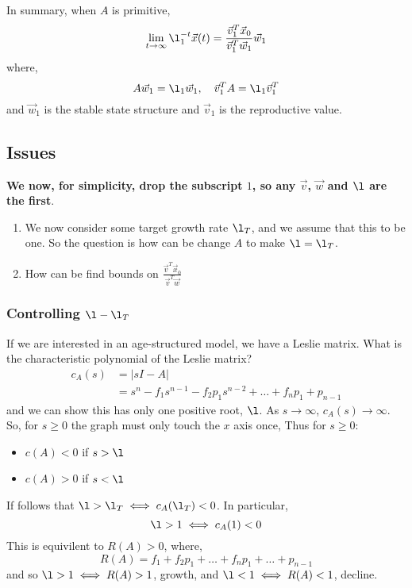 \noindent
In summary, when $A$ is primitive,
$$ \lim_{t \to \infty} \l_1^{-t}\vec x(t) = \frac{\vec v_1^T \vec x_0}{\vec v_1^T\vec w_1}\vec w_1 $$
where,
$$ A\vec w_1 = \l_1\vec w_1, \quad \vec v_1^T A = \l_1\vec v_1^T $$
and $\vec w_1$ is the stable state structure and $\vec v_1$ is the reproductive value.\\

\subsection{Issues}

\textbf{We now, for simplicity, drop the subscript $1$, so any $\vec v$, $\vec w$ and $\l$ are the first}.\\

\noindent
\begin{enumerate}
  \item We now consider some target growth rate $\l_T$, and we assume that this to be one. So the question is how can be change $A$ to make $\l = \l_T$.
  \item How can be find bounds on $\frac{\vec v^T \vec x_0}{\vec v^T\vec w}$
\end{enumerate}

\subsubsection{Controlling $\l - \l_T$}
If we are interested in an age-structured model, we have a Leslie matrix. What is the characteristic polynomial of the Leslie matrix?
\begin{align*}
  c_A(s) &= |sI - A| \\
  &= s^n - f_1s^{n-1} - f_2p_1s^{n-2} + \dots + f_np_1 + p_{n-1}
\end{align*}
and we can show this has only one positive root, $\l$. As $s \to \infty$, $c_A(s) \to \infty$. So, for $s \ge 0$ the graph must only touch the $x$ axis once,
Thus for $s \ge 0$:
\begin{itemize}
  \item $c(A) < 0$ if $s > \l$
  \item $c(A) > 0$ if $s < \l$
\end{itemize}
If follows that $\l > \l_T \iff c_A(\l_T) < 0$. In particular,
$$ \l > 1 \iff c_A(1) < 0 $$
This is equivilent to $R(A) > 0$, where,
$$ R(A) = f_1 + f_2p_1 + \dots + f_np_1 + \dots + p_{n-1} $$ and so $\l > 1 \iff R(A) > 1$, growth, and $\l < 1 \iff R(A) < 1$, decline.

